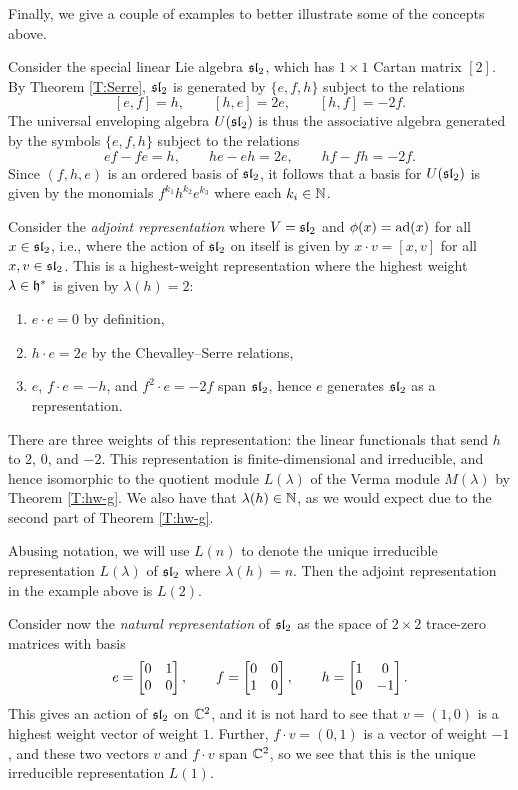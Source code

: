 Finally, we give a couple of examples to better illustrate some of the concepts above.

\begin{example}\label{E:sl2-ad}
    Consider the special linear Lie algebra $\mathfrak{sl}_2$, which has $1\times 1$ Cartan matrix $[2]$.
    By Theorem \ref{T:Serre}, $\mathfrak{sl}_2$ is generated by $\{e,f,h\}$ subject to the relations
    \[[e,f]=h, \qquad [h,e]=2e, \qquad [h,f]=-2f.\]
    The universal enveloping algebra $U(\mathfrak{sl}_2)$ is thus the associative algebra generated by the symbols $\{e,f,h\}$ subject to the relations
    \[ef-fe=h, \qquad he-eh=2e, \qquad hf-fh=-2f.\]
    Since $(f,h,e)$ is an ordered basis of $\mathfrak{sl}_2$, it follows that a basis for $U(\mathfrak{sl}_2)$ is given by the monomials $f^{k_1}h^{k_2}e^{k_3}$ where each $k_i\in\mathbb{N}$.

    Consider the \emph{adjoint representation} where $V=\mathfrak{sl}_2$ and $\phi(x)=\operatorname{ad}(x)$ for all $x\in\mathfrak{sl}_2$, i.e., where the action of $\mathfrak{sl}_2$ on itself is given by $x\cdot v=[x,v]$ for all $x,v\in\mathfrak{sl}_2$.
    This is a highest-weight representation where the highest weight $\lambda\in\mathfrak{h}^*$ is given by $\lambda(h)=2$:
    \begin{enumerate}
        \item $e\cdot e = 0$ by definition,
        \item $h\cdot e = 2e$ by the Chevalley--Serre relations,
        \item $e$, $f\cdot e = -h$, and $f^2\cdot e = -2f$ span $\mathfrak{sl}_2$, hence $e$ generates $\mathfrak{sl}_2$ as a representation.
    \end{enumerate}
    There are three weights of this representation: the linear functionals that send $h$ to $2$, $0$, and $-2$.
    This representation is finite-dimensional and irreducible, and hence isomorphic to the quotient module $L(\lambda)$ of the Verma module $M(\lambda)$ by Theorem \ref{T:hw-g}.
    We also have that $\lambda(h)\in\mathbb{N}$, as we would expect due to the second part of Theorem \ref{T:hw-g}.
\end{example}

Abusing notation, we will use $L(n)$ to denote the unique irreducible representation $L(\lambda)$ of $\mathfrak{sl}_2$ where $\lambda(h)=n$.
Then the adjoint representation in the example above is $L(2)$.

\begin{example}\label{E:sl2-C2}
    Consider now the \emph{natural representation} of $\mathfrak{sl}_2$ as the space of $2\times 2$ trace-zero matrices with basis
    \[e = \bmat{0 & 1 \\ 0 & 0}, \qquad f=\bmat{0 & 0 \\ 1 & 0}, \qquad h=\bmat{1 & 0 \\ 0 & -1}.\]
    This gives an action of $\mathfrak{sl}_2$ on $\mathbb{C}^2$, and it is not hard to see that $v=(1,0)$ is a highest weight vector of weight $1$.
    Further, $f\cdot v = (0,1)$ is a vector of weight $-1$, and these two vectors $v$ and $f\cdot v$ span $\mathbb{C}^2$, so we see that this is the unique irreducible representation $L(1)$.
\end{example}


